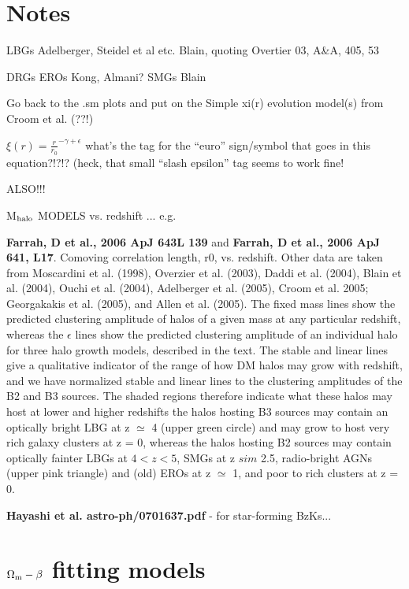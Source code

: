 \documentclass[usenatbib]{mn2e}
\begin{document}
\section{Notes}
LBGs Adelberger, Steidel et al etc. 
Blain, quoting Overtier 03, A\&A, 405, 53


DRGs
EROs Kong, Almani?
SMGs Blain

Go back to the .sm plots and put on the 
Simple xi(r) evolution model(s) from Croom et al. (??!)

$\xi(r) = \frac{r}{r_{0}}^{-\gamma + \epsilon}$ what's the tag for the ``euro'' sign/symbol that goes in this equation?!?!?
(heck, that small ``slash epsilon'' tag seems to work fine!

{\LARGE ALSO!!! }


M$_{\rm halo}$ MODELS vs. redshift ... 
e.g. 


{\bf Farrah, D et al.,  2006 ApJ  643L 139} and 
{\bf Farrah, D et al.,  2006 ApJ  641, L17}.  
Comoving correlation length, r0, vs. redshift. Other data are taken from Moscardini et al. (1998), Overzier et al. (2003), Daddi et al. (2004), Blain et al. (2004), Ouchi et al. (2004), Adelberger et al. (2005), Croom et al. 2005; Georgakakis et al. (2005), and Allen et al. (2005). The fixed mass lines show the predicted clustering amplitude of halos of a given mass at any particular redshift, whereas the $\epsilon$ lines show the predicted clustering amplitude of an individual halo for three halo growth models, described in the text. The stable and linear lines give a qualitative indicator of the range of how DM halos may grow with redshift, and we have normalized stable and linear lines to the clustering amplitudes of the B2 and B3 sources. The shaded regions therefore indicate what these halos may host at lower and higher redshifts the halos hosting B3 sources may contain an optically bright LBG at z $\simeq$ 4 (upper green circle) and may grow to host very rich galaxy clusters at z = 0, whereas the halos hosting B2 sources may contain optically fainter LBGs at $4 < z < 5$, SMGs at z $sim$ 2.5, radio-bright AGNs (upper pink triangle) and (old) EROs at z $\simeq$ 1, and poor to rich clusters at z = 0.

{\bf Hayashi et al. astro-ph/0701637.pdf} - for star-forming BzKs...




\section{$\Omega_{\rm m}-\beta$ fitting models}
\end{document}

